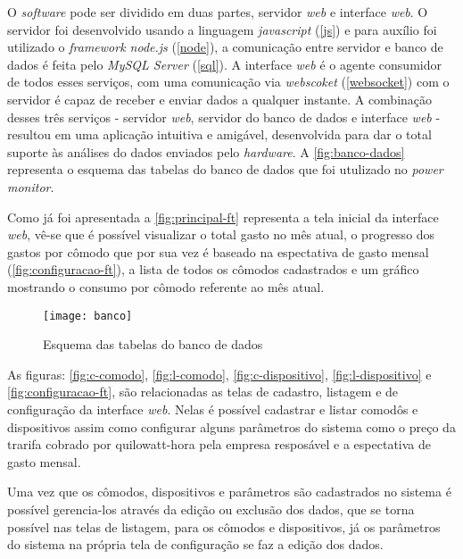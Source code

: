 O \textit{software} pode ser dividido em duas partes, servidor \textit{web} e interface \textit{web}. O servidor foi desenvolvido usando a linguagem
\textit{javascript} (\autoref{js}) e para auxílio foi utilizado o \textit{framework node.js} (\autoref{node}), a comunicação entre servidor e banco de dados
é feita pelo \textit{MySQL Server} (\autoref{sql}). A interface \textit{web} é o agente consumidor de todos esses serviços, com uma comunicação via 
\textit{webscoket} (\autoref{websocket}) com o servidor é capaz de receber e enviar dados a qualquer instante. A combinação desses três serviços - servidor \textit{web},
servidor do banco de dados e interface \textit{web} - resultou em uma aplicação intuitiva e amigável, desenvolvida para dar o total suporte às análises do dados
enviados pelo \textit{hardware}. A \autoref{fig:banco-dados} representa o esquema das tabelas do banco de dados que foi utulizado no \textit{power monitor}.

Como já foi apresentada a \autoref{fig:principal-ft} representa a tela inicial da interface \textit{web}, vê-se que é possível
visualizar o total gasto no mês atual, o progresso dos gastos por cômodo que por sua vez é baseado na espectativa de gasto mensal (\autoref{fig:configuracao-ft}), a lista
de todos os cômodos cadastrados e um gráfico mostrando o consumo por cômodo referente ao mês atual.

\begin{figure}[h!]
	\texttt{[image: banco]}
	\centering
	\caption[Esquema das tabelas do banco de dados]{Esquema das tabelas do banco de dados}
	\label{fig:banco-dados}
\end{figure}
\FloatBarrier

As figuras: \ref{fig:c-comodo}, \ref{fig:l-comodo}, \ref{fig:c-dispositivo}, \ref{fig:l-dispositivo} e \ref{fig:configuracao-ft}, 
são relacionadas as telas de cadastro, listagem e de configuração da interface \textit{web}. Nelas é possível cadastrar e listar comodôs e dispositivos assim como 
configurar alguns parâmetros do sistema como o preço da trarifa cobrado por quilowatt-hora pela empresa resposável e a espectativa de gasto mensal.

Uma vez que os cômodos, dispositivos e parâmetros são cadastrados no sistema é possível gerencia-los através da edição ou exclusão dos dados, que se torna possível
nas telas de listagem, para os cômodos e dispositivos, já os parâmetros do sistema na própria tela de configuração se faz a edição dos dados. 

